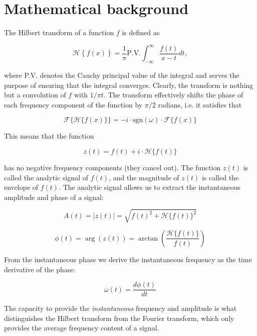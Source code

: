 \documentclass[a4paper, 12pt]{article}
\begin{document}
\section*{Mathematical background}

The Hilbert transform of a function $f$ is defined as 

$$\mathcal{H}\left\{ f(x) \right\}  = \frac{1}{\pi} \text{P.V.} \int_{-\infty}^{\infty} \frac{f(t)}{x - t} dt,$$

where P.V. denotes the Cauchy principal value of the integral and serves the
purpose of ensuring that the integral converges. Clearly, the transform is
nothing but a convolution of $f$ with $1 / \pi t$. The transform effectively 
shifts the phase of each frequency component of the function by $\pi / 2$
radians, i.e. it satisfies that  

\begin{equation*}
    \mathcal{F} \{ \mathcal{H}\{ f(x) \} \} = -i \cdot \text{sgn}(\omega) \cdot
    \mathcal{F}\{ f(x) \}
\end{equation*}

This means that the function

\begin{equation*}
    z(t) = f(t) + i \cdot \mathcal{H}\{ f(t) \}
\end{equation*}

has no negative frequency components (they cancel out). The function $z(t)$ is
called the analytic signal of $f(t)$, and the magnitude of $z(t)$ is called the
envelope of $f(t)$. The analytic signal allows us to extract the instantaneous
amplitude and phase of a signal: 

\begin{equation*}
    A(t) = |z(t)| = \sqrt{f(t)^2 + \mathcal{H}\{ f(t) \}^2}
\end{equation*}

\begin{equation*}
    \phi(t) = \arg(z(t)) = \arctan\left( \frac{\mathcal{H}\{ f(t) \}}{f(t)}
    \right)
\end{equation*}

From the instantaneous phase we derive the instantaneous frequency as the time
derivative of the phase:

\begin{equation*}
    \omega(t) = \frac{d\phi(t)}{dt}
\end{equation*}

The capacity to provide the \textit{instantaneous} frequency and amplitude is
what distinguishes the Hilbert transform from the Fourier transform, which only
provides the average frequency content of a signal.
\end{document}
